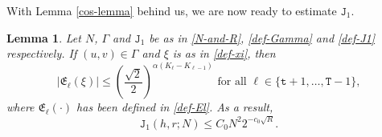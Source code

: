 \documentclass[12pt, twoside]{article}
\newtheorem{lemma}[theorem]{Lemma}
\theoremstyle{definition}
\numberwithin{equation}{section}
\begin{document}
\noindent With Lemma \ref{cos-lemma} behind us, we are now ready to estimate $\mathtt J_1$. 
\begin{lemma} \label{J1-lemma}
Let $N$, $\Gamma$ and $\mathtt J_1$ be as in \eqref{N-and-R}, \eqref{def-Gamma} and \eqref{def-J1} respectively.  If $(u, v) \in \Gamma$ and $\xi$ is as in \eqref{def-xi}, then 
\begin{equation} \label{El-bound} \bigl| \mathfrak E_{\ell}(\xi) \bigr| \leq \left( \frac{\sqrt 2}{2}\right)^{\alpha(K_{\ell} - K_{\ell-1})} \text{ for all } \ell \in \{\mathtt t+1, \ldots, \mathtt T-1\}, \end{equation} 
where $\mathfrak E_{\ell}(\cdot)$ has been defined in \eqref{def-El}. As a result, 
\begin{equation}  \label{J1-bound}
\mathtt J_1(h, r; N)  \leq C_0 N^2 2^{-c_0 \sqrt{R}}. 
\end{equation}  
 \end{lemma} 
\end{document}
